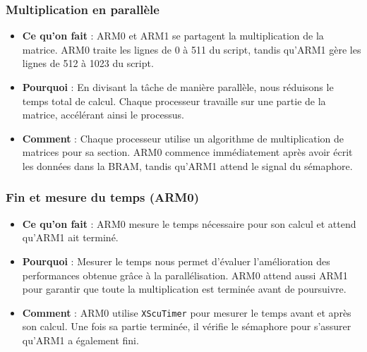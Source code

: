 \documentclass[../CSC_5RO06_TA.tex]{subfiles}
\begin{document}
\subsubsection{Multiplication en parallèle}
\begin{itemize}
\item \textbf{Ce qu’on fait} : ARM0 et ARM1 se partagent la multiplication de la matrice. ARM0 traite les lignes de 0 à 511 du script, tandis qu'ARM1 gère les lignes de 512 à 1023 du script.

\item \textbf{Pourquoi} : En divisant la tâche de manière parallèle, nous réduisons le temps total de calcul. Chaque processeur travaille sur une partie de la matrice, accélérant ainsi le processus.

\item \textbf{Comment} : Chaque processeur utilise un algorithme de multiplication de matrices pour sa section. ARM0 commence immédiatement après avoir écrit les données dans la BRAM, tandis qu'ARM1 attend le signal du sémaphore.
\end{itemize}

\subsubsection{Fin et mesure du temps (ARM0)}
\begin{itemize}
\item \textbf{Ce qu’on fait} : ARM0 mesure le temps nécessaire pour son calcul et attend qu'ARM1 ait terminé.

\item \textbf{Pourquoi} : Mesurer le temps nous permet d'évaluer l'amélioration des performances obtenue grâce à la parallélisation. ARM0 attend aussi ARM1 pour garantir que toute la multiplication est terminée avant de poursuivre.

\item \textbf{Comment} : ARM0 utilise \texttt{XScuTimer} pour mesurer le temps avant et après son calcul. Une fois sa partie terminée, il vérifie le sémaphore pour s'assurer qu'ARM1 a également fini.
\end{itemize}
\end{document}
